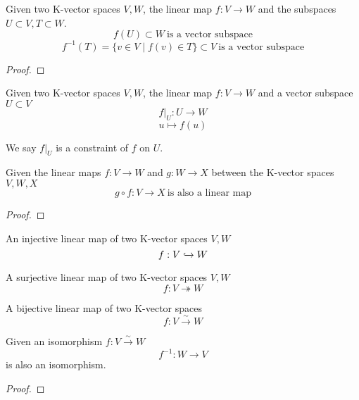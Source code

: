 \begin{proposition}
   Given two K-vector spaces \(V, W\), the linear map \(f: V \to W\) and the subspaces \(U \subset V, T \subset W\).
   \[f(U) \subset W~\text{is a vector subspace}\]
   \[f^{-1}(T) = \{v \in V \mid f(v) \in T\} \subset V~\text{is a vector subspace}\]
\end{proposition}
\begin{proof}
\end{proof}

\begin{definition}[Constraint]
   Given two K-vector spaces \(V, W\), the linear map \(f: V \to W\) and a vector subspace \(U \subset V\)
   \[f|_{U}: U \to W\]
   \[u \mapsto f(u)\]
\end{definition}
\begin{remark}
   We say \(f|_{U}\) is a constraint of \(f\) on \(U\).
\end{remark}

\begin{proposition}[\(V \to W \to X = V \to X\)]
   Given the linear maps \(f: V \to W\) and \(g: W \to X\) between the K-vector spaces \(V, W, X\)
   \[g \circ f: V \to X~\text{is also a linear map}\]
\end{proposition}
\begin{proof}
\end{proof}

\begin{definition}[Monomorphism]
   An injective linear map of two K-vector spaces \(V, W\)
   \[f: V \xhookrightarrow{} W\]
\end{definition}

\begin{definition}[Epimorphism]
   A surjective linear map of two K-vector spaces \(V, W\)
   \[f: V \twoheadrightarrow W\]
\end{definition}

\begin{definition}[Isomorphism]
   A bijective linear map of two K-vector spaces
   \[f: V \xrightarrow{\sim} W\]
\end{definition}

\begin{lemma}
   Given an isomorphism \(f: V \xrightarrow{\sim} W\)
   \[f^{-1}: W \to V\]
   is also an isomorphism.
\end{lemma}
\begin{proof}
\end{proof}

